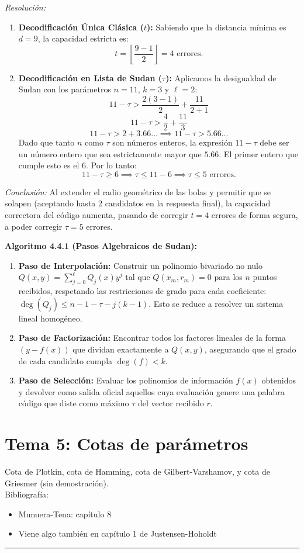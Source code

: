 \documentclass{article}
\newcommand{\hlinecolor}{\noindent\textcolor{azuloscuro}{\rule{\textwidth}{1pt}}}
\begin{document}
\textit{Resolución:}
\begin{enumerate}
    \item \textbf{Decodificación Única Clásica ($t$):} 
    Sabiendo que la distancia mínima es $d=9$, la capacidad estricta es:
    \[ t = \left\lfloor \frac{9-1}{2} \right\rfloor = 4 \text{ errores.} \]
    
    \item \textbf{Decodificación en Lista de Sudan ($\tau$):} 
    Aplicamos la desigualdad de Sudan con los parámetros $n=11$, $k=3$ y $\ell=2$:
    \[ 11 - \tau > \frac{2(3-1)}{2} + \frac{11}{2+1} \]
    \[ 11 - \tau > \frac{4}{2} + \frac{11}{3} \]
    \[ 11 - \tau > 2 + 3.66\dots \implies 11 - \tau > 5.66\dots \]
    Dado que tanto $n$ como $\tau$ son números enteros, la expresión $11 - \tau$ debe ser un número entero que sea estrictamente mayor que $5.66$. El primer entero que cumple esto es el $6$. Por lo tanto:
    \[ 11 - \tau \ge 6 \implies \tau \le 11 - 6 \implies \tau \le 5 \text{ errores.} \]
\end{enumerate}
\textit{Conclusión:} Al extender el radio geométrico de las bolas y permitir que se solapen (aceptando hasta 2 candidatos en la respuesta final), la capacidad correctora del código aumenta, pasando de corregir $t=4$ errores de forma segura, a poder corregir $\tau=5$ errores.

\vspace{0.3cm}
\textbf{Algoritmo 4.4.1 (Pasos Algebraicos de Sudan):}
\begin{enumerate}
    \item \textbf{Paso de Interpolación:} Construir un polinomio bivariado no nulo $Q(x,y) = \sum_{j=0}^\ell Q_j(x) y^j$ tal que $Q(x_m, r_m) = 0$ para los $n$ puntos recibidos, respetando las restricciones de grado para cada coeficiente: $\operatorname{deg}(Q_j) \le n - 1 - \tau - j(k-1)$. Esto se reduce a resolver un sistema lineal homogéneo.
    \item \textbf{Paso de Factorización:} Encontrar todos los factores lineales de la forma $(y - f(x))$ que dividan exactamente a $Q(x,y)$, asegurando que el grado de cada candidato cumpla $\operatorname{deg}(f) < k$.
    \item \textbf{Paso de Selección:} Evaluar los polinomios de información $f(x)$ obtenidos y devolver como salida oficial aquellos cuya evaluación genere una palabra código que diste como máximo $\tau$ del vector recibido $r$.
\end{enumerate}
\newpage
\section{Tema 5: Cotas de parámetros}
Cota de Plotkin, cota de Hamming, cota de Gilbert-Varshamov, y cota de Griesmer (sin demostración).\\
Bibliografía:
\begin{itemize}
\item Munuera-Tena: capítulo 8
\item Viene algo también en capítulo 1 de Justensen-Hoholdt
\end{itemize}
\hlinecolor{}
\vspace{0.5cm}
\end{document}

